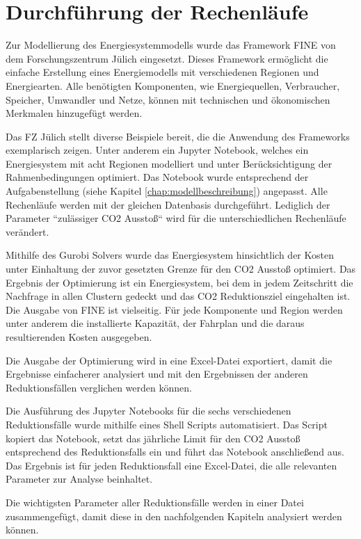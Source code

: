 \section{Durchführung der Rechenläufe}
Zur Modellierung des Energiesystemmodells wurde das Framework FINE von dem Forschungszentrum Jülich eingesetzt.
Dieses Framework ermöglicht die einfache Erstellung eines Energiemodells mit verschiedenen Regionen und Energiearten. Alle benötigten Komponenten, wie Energiequellen, Verbraucher, Speicher, Umwandler und Netze, können mit technischen und ökonomischen Merkmalen hinzugefügt werden. 

Das FZ Jülich stellt diverse Beispiele bereit, die die Anwendung des Frameworks exemplarisch zeigen. Unter anderem ein Jupyter Notebook, welches ein Energiesystem mit acht Regionen modelliert und unter Berücksichtigung der Rahmenbedingungen optimiert.  Das Notebook wurde entsprechend der Aufgabenstellung (siehe Kapitel \ref{chap:modellbeschreibung}) angepasst. Alle Rechenläufe werden mit der gleichen Datenbasis durchgeführt. Lediglich der Parameter ``zulässiger CO2 Ausstoß`` wird für die unterschiedlichen Rechenläufe verändert. 

Mithilfe des Gurobi Solvers wurde das Energiesystem hinsichtlich der Kosten unter Einhaltung der zuvor gesetzten Grenze für den CO2 Ausstoß optimiert. Das Ergebnis der Optimierung ist ein Energiesystem, bei dem in jedem Zeitschritt die Nachfrage in allen Clustern gedeckt und das CO2 Reduktionsziel eingehalten ist. Die Ausgabe von FINE ist vielseitig. Für jede Komponente und Region werden unter anderem die installierte Kapazität, der Fahrplan und die daraus resultierenden Kosten ausgegeben.

Die Ausgabe der Optimierung wird in eine Excel-Datei exportiert, damit die Ergebnisse einfacherer analysiert und mit den Ergebnissen der anderen Reduktionsfällen verglichen werden können. 

Die Ausführung des Jupyter Notebooks für die sechs verschiedenen Reduktionsfälle wurde mithilfe eines Shell Scripts automatisiert. Das Script kopiert das Notebook, setzt das jährliche Limit für den CO2 Ausstoß entsprechend des Reduktionsfalls ein und führt das Notebook anschließend aus. Das Ergebnis ist für jeden Reduktionsfall eine Excel-Datei, die alle relevanten Parameter zur Analyse beinhaltet.

Die wichtigsten Parameter aller Reduktionsfälle werden in einer Datei zusammengefügt, damit diese in den nachfolgenden Kapiteln analysiert werden können.
